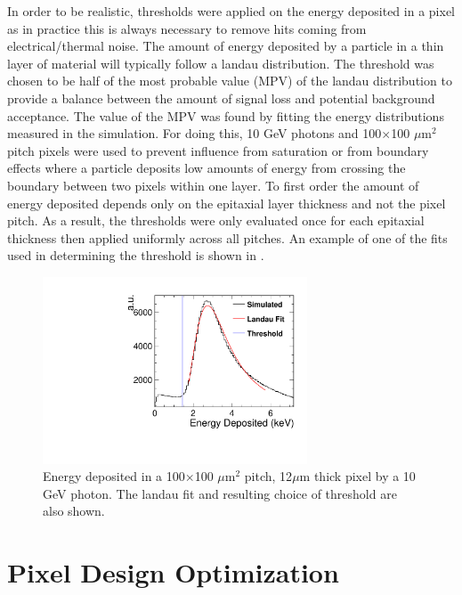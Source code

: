 In order to be realistic, thresholds were applied on the energy deposited in a pixel as in practice this is always necessary to remove hits coming from electrical/thermal noise. The amount of energy deposited by a particle in a thin layer of material will typically follow a landau distribution. The threshold was chosen to be half of the most probable value (MPV) of the landau distribution to provide a balance between the amount of signal loss and potential background acceptance. The value of the MPV was found by fitting the energy distributions measured in the simulation. For doing this, 10 GeV photons and 100$\times$100 $\mu$m$^2$ pitch pixels were used to prevent influence from saturation or from boundary effects where a particle deposits low amounts of energy from crossing the boundary between two pixels within one layer. To first order the amount of energy deposited depends only on the epitaxial layer thickness and not the pixel pitch. As a result, the thresholds were only evaluated once for each epitaxial thickness then applied uniformly across all pitches. An example of one of the fits used in determining the threshold is shown in .

\begin{figure}
  \centering
  \includegraphics[width=0.7\textwidth,keepaspectratio]{DECALStudies/fig/Landau_100x12_10GeV.pdf}
  \caption{Energy deposited in a 100$\times$100 $\mu$m$^2$ pitch, 12$\mu$m thick pixel by a 10 GeV photon. The landau fit and resulting choice of threshold are also shown.}
  \label{fig:thresholdfit}
\end{figure}


\section{Pixel Design Optimization}

